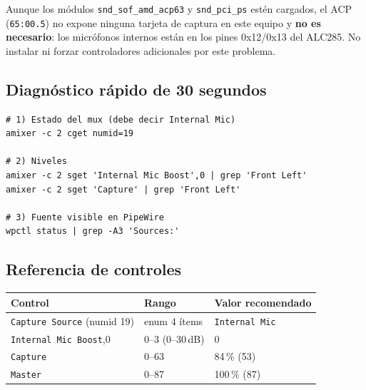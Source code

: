 \documentclass[12pt,a4paper]{article}
\begin{document}
Aunque los módulos \texttt{snd\_sof\_amd\_acp63} y \texttt{snd\_pci\_ps} estén
cargados, el ACP (\texttt{65:00.5}) no expone ninguna tarjeta de captura en
este equipo y \textbf{no es necesario}: los micrófonos internos están en los
pines 0x12/0x13 del ALC285. No instalar ni forzar controladores adicionales
por este problema.

\subsection{Diagnóstico rápido de 30 segundos}

\begin{lstlisting}[style=bash]
# 1) Estado del mux (debe decir Internal Mic)
amixer -c 2 cget numid=19

# 2) Niveles
amixer -c 2 sget 'Internal Mic Boost',0 | grep 'Front Left'
amixer -c 2 sget 'Capture' | grep 'Front Left'

# 3) Fuente visible en PipeWire
wpctl status | grep -A3 'Sources:'
\end{lstlisting}

\subsection{Referencia de controles}

\begin{center}
\begin{tabular}{lll}
  \toprule
  Control & Rango & Valor recomendado \\
  \midrule
  \texttt{Capture Source} (numid 19) & enum 4 ítems & \texttt{Internal Mic} \\
  \texttt{Internal Mic Boost},0 & 0--3 (0--30\,dB) & 0 \\
  \texttt{Capture} & 0--63 & 84\,\% (53) \\
  \texttt{Master} & 0--87 & 100\,\% (87) \\
  \bottomrule
\end{tabular}
\end{center}
\end{document}
